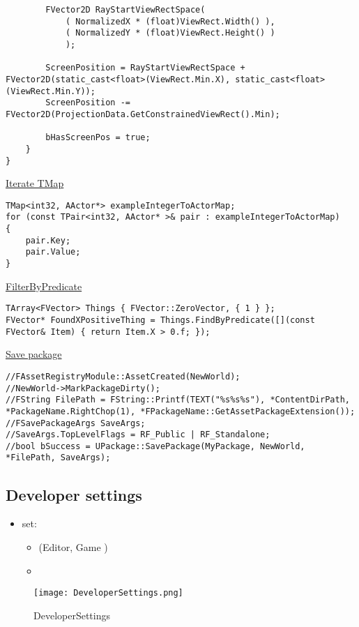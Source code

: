 \begin{lstlisting}
        FVector2D RayStartViewRectSpace(
            ( NormalizedX * (float)ViewRect.Width() ),
            ( NormalizedY * (float)ViewRect.Height() )
            );

        ScreenPosition = RayStartViewRectSpace + FVector2D(static_cast<float>(ViewRect.Min.X), static_cast<float>(ViewRect.Min.Y));
        ScreenPosition -= FVector2D(ProjectionData.GetConstrainedViewRect().Min);

        bHasScreenPos = true;
    }
}
\end{lstlisting}

\uline{Iterate TMap}
\begin{lstlisting}
TMap<int32, AActor*> exampleIntegerToActorMap;
for (const TPair<int32, AActor* >& pair : exampleIntegerToActorMap)
{
    pair.Key;
    pair.Value;
}
\end{lstlisting}
    
\uline{FilterByPredicate}
\begin{lstlisting}
TArray<FVector> Things { FVector::ZeroVector, { 1 } };
FVector* FoundXPositiveThing = Things.FindByPredicate([](const FVector& Item) { return Item.X > 0.f; });    
\end{lstlisting}

\uline{Save package}
\begin{lstlisting}
//FAssetRegistryModule::AssetCreated(NewWorld);
//NewWorld->MarkPackageDirty();
//FString FilePath = FString::Printf(TEXT("%s%s%s"), *ContentDirPath, *PackageName.RightChop(1), *FPackageName::GetAssetPackageExtension());
//FSavePackageArgs SaveArgs;
//SaveArgs.TopLevelFlags = RF_Public | RF_Standalone;
//bool bSuccess = UPackage::SavePackage(MyPackage, NewWorld, *FilePath, SaveArgs);
\end{lstlisting}
    

    \subsection{Developer settings}
        \begin{itemize}
            \item set:
            \begin{itemize}
                \item {} (Editor, Game )
                \item {}
            \end{itemize}
        \end{itemize}

        \begin{figure}[H]
            \texttt{[image: DeveloperSettings.png]}
            \caption{DeveloperSettings}
            \label{}
        \end{figure}


